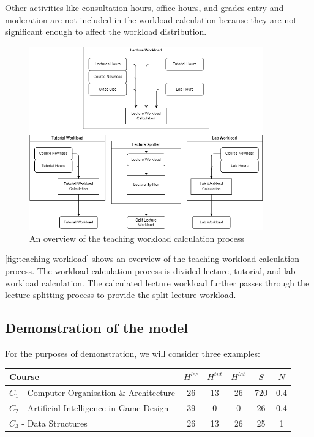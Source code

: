 Other activities like consultation hours, office hours, and grades entry and moderation are not included in the workload calculation because they are not significant enough to affect the workload distribution.

\begin{figure}[ht]
  \centering
  \includegraphics[width=0.9\textwidth]{images/teaching_workload.png}
  \caption{An overview of the teaching workload calculation process}
  \label{fig:teaching-workload}
\end{figure}

\autoref{fig:teaching-workload} shows an overview of the teaching workload calculation process. The workload calculation process is divided lecture, tutorial, and lab workload calculation. The calculated lecture workload further passes through the lecture splitting process to provide the split lecture workload.


\subsection{Demonstration of the model}
\label{sec:workload_demo}

For the purposes of demonstration, we will consider three examples:

\begin{table}[ht]
  \centering
  \begin{tabular}{|l|c|c|c|c|c|}
    \hline
    \textbf{Course}                                  & \(H^{lec}\) & \(H^{tut}\) & \(H^{lab}\) & \(S\) & \(N\) \\\hline
    \(C_1\) - Computer Organisation \& Architecture  & 26          & 13          & 26          & 720   & 0.4   \\\hline
    \(C_2\) - Artificial Intelligence in Game Design & 39          & 0           & 0           & 26    & 0.4   \\\hline
    \(C_3\) - Data Structures                        & 26          & 13          & 26          & 25    & 1     \\\hline
  \end{tabular}
\end{table}

